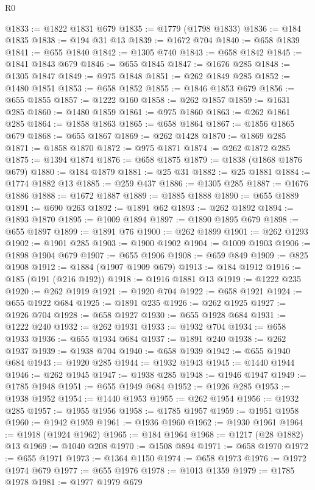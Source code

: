 \begin{lexlean}{R0}
\begin{coremodule}
@1833 := @1822 @1831 @679
@1835 := @1779 (@1798 @1833)
@1836 := @184 @1835
@1838 := @194 @31 @13
@1839 := @1672 @704
@1840 := @658 @1839
@1841 := @655 @1840
@1842 := @1305 @740
@1843 := @658 @1842
@1845 := @1841 @1843 @679
@1846 := @655 @1845
@1847 := @1676 @285
@1848 := @1305 @1847
@1849 := @975 @1848
@1851 := @262 @1849 @285
@1852 := @1480 @1851
@1853 := @658 @1852
@1855 := @1846 @1853 @679
@1856 := @655 @1855
@1857 := @1222 @160
@1858 := @262 @1857
@1859 := @1631 @285
@1860 := @1480 @1859
@1861 := @975 @1860
@1863 := @262 @1861 @285
@1864 := @1858 @1863
@1865 := @658 @1864
@1867 := @1856 @1865 @679
@1868 := @655 @1867
@1869 := @262 @1428
@1870 := @1869 @285
@1871 := @1858 @1870
@1872 := @975 @1871
@1874 := @262 @1872 @285
@1875 := @1394 @1874
@1876 := @658 @1875
@1879 := @1838 (@1868 @1876 @679)
@1880 := @184 @1879
@1881 := @25 @31
@1882 := @25 @1881
@1884 := @1774 @1882 @13
@1885 := @259 @437
@1886 := @1305 @285
@1887 := @1676 @1886
@1888 := @1672 @1887
@1889 := @1885 @1888
@1890 := @655 @1889
@1891 := @690 @263
@1892 := @1891 @62
@1893 := @262 @1892
@1894 := @1893 @1870
@1895 := @1009 @1894
@1897 := @1890 @1895 @679
@1898 := @655 @1897
@1899 := @1891 @76
@1900 := @262 @1899
@1901 := @262 @1293
@1902 := @1901 @285
@1903 := @1900 @1902
@1904 := @1009 @1903
@1906 := @1898 @1904 @679
@1907 := @655 @1906
@1908 := @659 @849
@1909 := @825 @1908
@1912 := @1884 (@1907 @1909 @679)
@1913 := @184 @1912
@1916 := @185 (@191 (@216 @192))
@1918 := @1916 @1881 @13
@1919 := @1222 @235
@1920 := @262 @1919
@1921 := @1920 @704
@1922 := @658 @1921
@1924 := @655 @1922 @684
@1925 := @1891 @235
@1926 := @262 @1925
@1927 := @1926 @704
@1928 := @658 @1927
@1930 := @655 @1928 @684
@1931 := @1222 @240
@1932 := @262 @1931
@1933 := @1932 @704
@1934 := @658 @1933
@1936 := @655 @1934 @684
@1937 := @1891 @240
@1938 := @262 @1937
@1939 := @1938 @704
@1940 := @658 @1939
@1942 := @655 @1940 @684
@1943 := @1920 @285
@1944 := @1932 @1943
@1945 := @1440 @1944
@1946 := @262 @1945
@1947 := @1938 @285
@1948 := @1946 @1947
@1949 := @1785 @1948
@1951 := @655 @1949 @684
@1952 := @1926 @285
@1953 := @1938 @1952
@1954 := @1440 @1953
@1955 := @262 @1954
@1956 := @1932 @285
@1957 := @1955 @1956
@1958 := @1785 @1957
@1959 := @1951 @1958
@1960 := @1942 @1959
@1961 := @1936 @1960
@1962 := @1930 @1961
@1964 := @1918 (@1924 @1962)
@1965 := @184 @1964
@1968 := @1217 (@28 @1882) @13
@1969 := @1040 @208
@1970 := @1508 @894
@1971 := @658 @1970
@1972 := @655 @1971
@1973 := @1364 @1150
@1974 := @658 @1973
@1976 := @1972 @1974 @679
@1977 := @655 @1976
@1978 := @1013 @1359
@1979 := @1785 @1978
@1981 := @1977 @1979 @679

\end{coremodule}
\end{lexlean}

